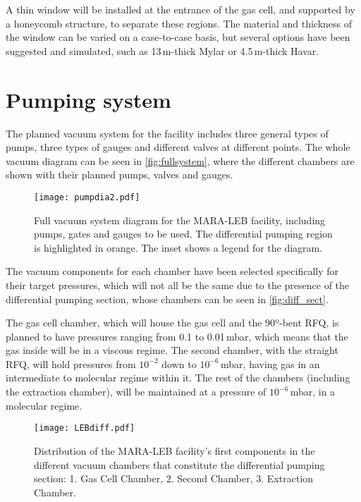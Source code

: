 A thin window will be installed at the entrance of the gas cell, and supported by a honeycomb structure, to separate these regions. The material and thickness of the window can be varied on a case-to-case basis, but several options have been suggested and simulated, such as 13\,\textmu m-thick Mylar or 4.5\,\textmu m-thick Havar.

\section{Pumping system}
\label{sec:pump}

The planned vacuum system for the facility includes three general types of pumps, three types of gauges and different valves at different points. The whole vacuum diagram can be seen in \autoref{fig:fullsystem}, where the different chambers are shown with their planned pumps, valves and gauges.

\begin{figure}[h]
    \centering
    \texttt{[image: pumpdia2.pdf]}
     \caption[Full vacuum system for MARA-LEB]{Full vacuum system diagram for the MARA-LEB facility, including pumps, gates and gauges to be used. The differential pumping region is highlighted in orange. The inset shows a legend for the diagram.}
     \label{fig:fullsystem}
 \end{figure}

The vacuum components for each chamber have been selected specifically for their target pressures, which will not all be the same due to the presence of the differential pumping section, whose chambers can be seen in \autoref{fig:diff_sect}. 
\newpage

The gas cell chamber, which will house the gas cell and the 90º-bent RFQ, is planned to have pressures ranging from 0.1 to 0.01\,mbar, which means that the gas inside will be in a viscous regime. The second chamber, with the straight RFQ, will hold pressures from $10^{-2}$ down to $10^{-6}$\,mbar, having gas in an intermediate to molecular regime within it. The rest of the chambers (including the extraction chamber), will be maintained at a pressure of $10^{-6}$\,mbar, in a molecular regime. 


 \begin{figure}[H]
     \centering
      \texttt{[image: LEBdiff.pdf]}
      \caption[Differential pumping chamber distribution]{Distribution of the MARA-LEB facility's first components in the different vacuum chambers that constitute the differential pumping section: 1. Gas Cell Chamber, 2. Second Chamber, 3. Extraction Chamber.}
      \label{fig:diff_sect}
  \end{figure}

